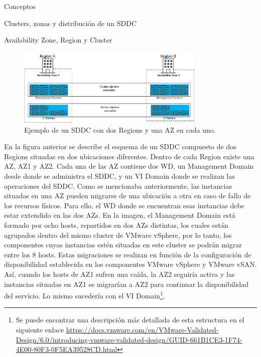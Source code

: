 \begin{section}{Conceptos}
\begin{subsection}{Clusters, zonas y distribución de un SDDC}
\begin{subsubsection}{Availability Zone, Region y Cluster}
\begin{figure}[h!]
  \centering
  \includegraphics[width=0.8\textwidth]{imaxes/conceptosPrevios/AZRegionCluster.png}
  \caption{Ejemplo de un SDDC con dos Regions y una AZ en cada uno.}
  \label{fig:az-region-cluster}
\end{figure}
En la figura anterior se describe el esquema de un SDDC compuesto de dos Regions situadas en dos ubicaciones diferentes. Dentro de cada Region existe una AZ, AZ1 y AZ2. Cada una de las AZ contiene dos WD, un Management Domain desde donde se administra el SDDC, y un VI Domain donde se realizan las operaciones del SDDC. Como se mencionaba anteriormente, las instancias situadas en una AZ pueden migrarse de una ubicación a otra en caso de fallo de los recursos físicos. Para ello, el WD donde se encuentran esas instancias debe estar extendido en las dos AZs. En la imagen, el Management Domain está formado por ocho hosts, repartidos en dos AZs distintas, los cuales están agrupados dentro del mismo cluster de VMware vSphere, por lo tanto, los componentes cuyas instancias estén situadas en este cluster se podrán migrar entre los 8 hosts. Estas migraciones se realizan en función de la configuración de disponibilidad establecida en los componentes VMware vSphere y VMware vSAN. Así, cuando los hosts de AZ1 sufren una caída, la AZ2 seguiría activa y las instancias situadas en AZ1 se migrarían a AZ2 para continuar la disponibilidad del servicio. Lo mismo sucedería con el VI Domain\footnote{Se puede encontrar una descripción más detallada de esta estructura en el siguiente enlace \url{https://docs.vmware.com/en/VMware-Validated-Design/6.0/introducing-vmware-validated-design/GUID-661B1CE3-1F74-4E00-80F3-0F5EA39528CD.html}}.



\end{subsubsection}
\end{subsection}
\end{section}
